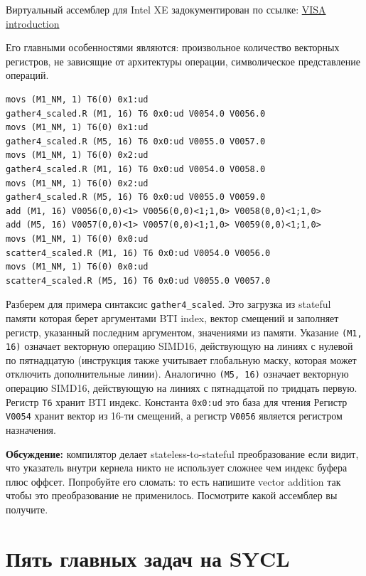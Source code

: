 \documentclass[a4paper,12pt,oneside]{article}
\begin{document}
Виртуальный ассемблер для Intel XE задокументирован по ссылке:
\href{https://github.com/intel/intel-graphics-compiler/blob/master/documentation/visa/1_introduction.md}{VISA introduction}

Его главными особенностями являются: произвольное количество векторных регистров, не зависящие от архитектуры операции, символическое представление операций.

\begin{lstlisting}[language={[x86masm]Assembler},caption={Сложение векторов: VISA ассемблер},label={lst:syclvaddvisa}]
movs (M1_NM, 1) T6(0) 0x1:ud
gather4_scaled.R (M1, 16) T6 0x0:ud V0054.0 V0056.0
movs (M1_NM, 1) T6(0) 0x1:ud
gather4_scaled.R (M5, 16) T6 0x0:ud V0055.0 V0057.0
movs (M1_NM, 1) T6(0) 0x2:ud
gather4_scaled.R (M1, 16) T6 0x0:ud V0054.0 V0058.0
movs (M1_NM, 1) T6(0) 0x2:ud
gather4_scaled.R (M5, 16) T6 0x0:ud V0055.0 V0059.0
add (M1, 16) V0056(0,0)<1> V0056(0,0)<1;1,0> V0058(0,0)<1;1,0>
add (M5, 16) V0057(0,0)<1> V0057(0,0)<1;1,0> V0059(0,0)<1;1,0>
movs (M1_NM, 1) T6(0) 0x0:ud
scatter4_scaled.R (M1, 16) T6 0x0:ud V0054.0 V0056.0
movs (M1_NM, 1) T6(0) 0x0:ud
scatter4_scaled.R (M5, 16) T6 0x0:ud V0055.0 V0057.0
\end{lstlisting}

Разберем для примера синтаксис \lstinline!gather4_scaled!. Это загрузка из stateful памяти которая берет аргументами BTI index, вектор смещений и заполняет регистр, указанный последним аргументом, значениями из памяти.
Указание \lstinline!(M1, 16)! означает векторную операцию SIMD16, действующую на линиях с нулевой по пятнадцатую (инструкция также учитывает глобальную маску, которая может отключить дополнительные линии).
Аналогично \lstinline!(M5, 16)! означает векторную операцию SIMD16, действующую на линиях с пятнадцатой по тридцать первую.
Регистр \lstinline!T6! хранит BTI индекс.
Константа \lstinline!0x0:ud! это база для чтения
Регистр \lstinline!V0054! хранит вектор из 16-ти смещений, а регистр \lstinline!V0056! является регистром назначения.

\textbf{Обсуждение:} компилятор делает stateless-to-stateful преобразование если видит, что указатель внутри кернела никто не использует сложнее чем индекс буфера плюс оффсет. Попробуйте его сломать: то есть напишите vector addition так чтобы это преобразование не применилось. Посмотрите какой ассемблер вы получите.

\pagebreak
\section{Пять главных задач на SYCL}\label{sec:FiveTasks}
\end{document}
